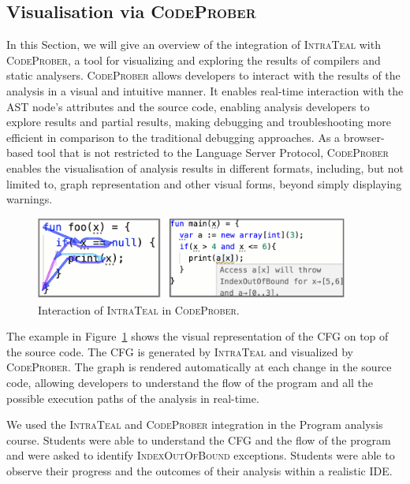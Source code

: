 \subsection{Visualisation via \textsc{CodeProber}}
In this Section, we will give an overview of the integration of \textsc{IntraTeal}
with \textsc{CodeProber}, a tool for visualizing and
exploring the results of compilers and static analysers. \textsc{CodeProber}
allows developers to interact with the results of the analysis in a visual and intuitive
manner. It enables real-time interaction with the AST node's attributes and the source code,
enabling analysis developers to explore results and partial results, making
debugging and troubleshooting more efficient in comparison to the traditional debugging
approaches. As a browser-based tool that is not restricted to the Language Server Protocol,
\textsc{CodeProber} enables the visualisation of analysis results in different
formats, including, but not limited to, graph representation and other visual forms, beyond
simply displaying warnings.
\begin{figure}[H]
  \centering
  \includegraphics[width=0.92\textwidth]{kappa/img/CP.pdf}
  \caption{\label{fig:CodeProber} Interaction of \textsc{IntraTeal} in \textsc{CodeProber}.}
\end{figure}
The example in Figure~\ref{fig:CodeProber} shows the visual representation of the CFG on
top of the source code. The CFG is generated by \textsc{IntraTeal} and visualized by
\textsc{CodeProber}. The graph is rendered automatically at each change in the source code,
allowing developers to understand the flow of the program and all the possible execution paths of the
analysis in real-time.

We used the \textsc{IntraTeal} and \textsc{CodeProber} integration in the Program analysis
course. Students were able to understand the CFG and the flow of the program and
were asked to identify \textsc{IndexOutOfBound} exceptions. Students were able to
observe their progress and the outcomes of their analysis within a realistic IDE.



